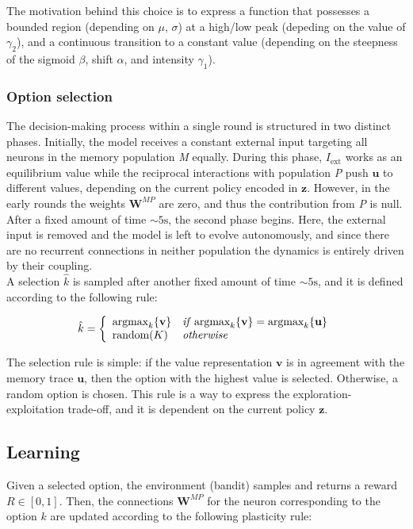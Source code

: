 \noindent The motivation behind this choice is to express a function that possesses a bounded region (depending on $\mu,\,\sigma$) at a high/low peak (depeding on the value of $\gamma_{2}$), and a continuous transition to a constant value (depending on the steepness of the sigmoid $\beta$, shift
$\alpha$, and intensity $\gamma_{1}$).

\subsubsection{Option selection}
The decision-making process within a single round is structured in two distinct phases. Initially, the model receives a constant external input targeting all neurons in the memory population \textit{M} equally.
During this phase, $I_{\text{ext}}$ works as an equilibrium value while the reciprocal interactions with population \textit{P} push $\textbf{u}$ to different values, depending on the current policy encoded in $\textbf{z}$. However, in the early rounds the weights $\textbf{W}^{MP}$ are zero, and thus
the contribution from \textit{P} is null. After a fixed amount of time $\sim 5 \text{s}$, the second phase begins. Here, the external input is removed and the model is left to evolve autonomously, and since there are no recurrent connections in neither population the dynamics is entirely driven by their coupling. \\
A selection $\hat{k}$ is sampled after another fixed amount of time $\sim 5 \text{s}$, and it is defined according to the following rule:

\begin{equation*}
    \hat{k} =
    \left\{
        \begin{array}{ll}
            \text{argmax}_{k}\{\textbf{v}\} & \text{\textit{if}}\; \text{argmax}_{k} \{\textbf{v}\} = \text{argmax}_{k} \{\textbf{u}\} \\
            \text{random}(K) & \text{\textit{otherwise}}
        \end{array}
    \right.
\end{equation*}

\noindent The selection rule is simple: if the value representation $\textbf{v}$ is in agreement with the memory trace $\textbf{u}$, then the option with the highest value is selected. Otherwise, a random option is chosen. This rule is a way to express the exploration-exploitation trade-off, and it is dependent on the current policy $\textbf{z}$.

\subsection{Learning}
Given a selected option, the environment (bandit) samples and returns a reward $R\in [0, 1]$.
Then, the connections $\textbf{W}^{MP}$ for the neuron corresponding to the option $k$ are updated according to the following plasticity rule:


